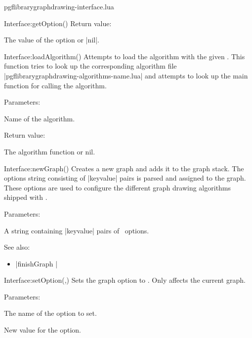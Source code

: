 \begin{filedescription}{pgflibrarygraphdrawing-interface.lua}
\begin{luacommand}{{Interface:getOption}()}
Return value:
\begin{parameterdescription} 
  \item[] The value of the  option or |nil|. 
\end{parameterdescription}


\end{luacommand}
\begin{luacommand}{{Interface:loadAlgorithm}()}
Attempts to load the algorithm with the given .  This function tries to look up the corresponding algorithm file |pgflibrarygraphdrawing-algorithms-name.lua| and attempts to look up the main function for calling the algorithm. 

Parameters:
\begin{parameterdescription}
	\item[\meta{name}] Name of the algorithm. 
\end{parameterdescription}


Return value:
\begin{parameterdescription} 
  \item[] The algorithm function or nil. 
\end{parameterdescription}


\end{luacommand}
\begin{luacommand}{{Interface:newGraph}()}
Creates a new graph and adds it to the graph stack.  The options string consisting of |{key}{value}| pairs is parsed and assigned to the graph. These options are used to configure the different graph drawing algorithms shipped with \tikzname. 

Parameters:
\begin{parameterdescription}
	\item[\meta{options}] A string containing |{key}{value}| pairs of \tikzname\ options. 
\end{parameterdescription}



See also:
\begin{itemize}
	\item[] |finishGraph |
\end{itemize}

\end{luacommand}
\begin{luacommand}{{Interface:setOption}(,)}
Sets the graph option  to . Only affects the current graph. 

Parameters:
\begin{parameterdescription}
	\item[\meta{name}] The name of the option to set.\item[\meta{value}] New value for the option. 
\end{parameterdescription}



\end{luacommand}

\end{filedescription}